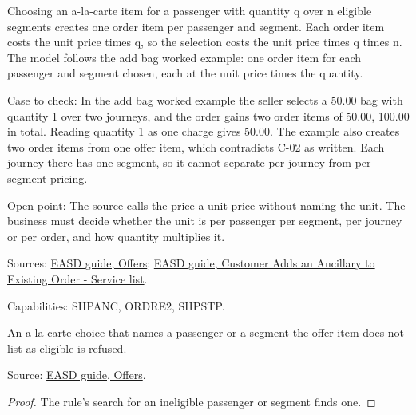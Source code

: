 \begin{definition}
  \label{def:ancillaries-alacarte-price}
  Choosing an a-la-carte item for a passenger with quantity q over n
  eligible segments creates one order item per passenger and segment. Each
  order item costs the unit price times q, so the selection costs the unit
  price times q times n.
  The model follows the add bag worked example: one order item for each
  passenger and segment chosen, each at the unit price times the quantity.

  Case to check: In the add bag worked example the seller selects a 50.00
  bag with quantity 1 over two journeys, and the order gains two order items
  of 50.00, 100.00 in total. Reading quantity 1 as one charge gives 50.00.
  The example also creates two order items from one offer item, which
  contradicts C-02 as written. Each journey there has one segment, so it
  cannot separate per journey from per segment pricing.

  Open point: The source calls the price a unit price without naming the
  unit. The business must decide whether the unit is per passenger per
  segment, per journey or per order, and how quantity multiplies it.

  Sources: \href{https://standards.atlassian.net/wiki/spaces/EASD/pages/600637464}{EASD guide, Offers};
  \href{https://standards.atlassian.net/wiki/spaces/EASD/pages/842301531}{EASD guide, Customer Adds an Ancillary to Existing Order - Service list}.

  Capabilities: SHPANC, ORDRE2, SHPSTP.
\end{definition}

\begin{theorem}
  \label{thm:ancillaries-alacarte-refuses-ineligible}
  An a-la-carte choice that names a passenger or a segment the offer item
  does not list as eligible is refused.

  Source: \href{https://standards.atlassian.net/wiki/spaces/EASD/pages/600637464}{EASD guide, Offers}.
\end{theorem}
\begin{proof}
  The rule's search for an ineligible passenger or segment finds one.
\end{proof}

